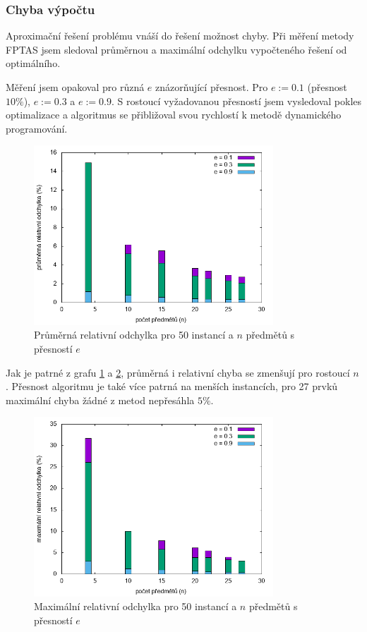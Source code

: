 \documentclass{article}
\begin{document}
\subsubsection*{Chyba výpočtu}

Aproximační řešení problému vnáší do řešení možnost chyby.
Při měření metody FPTAS jsem sledoval průměrnou a maximální odchylku vypočteného řešení od optimálního.

Měření jsem opakoval pro různá $e$ znázorňující přesnost.
Pro $e := 0.1$ (přesnost $10 \%$), $e := 0.3$ a $e := 0.9$.
S rostoucí vyžadovanou přesností jsem vysledoval pokles optimalizace a algoritmus se přibližoval svou rychlostí k metodě dynamického programování.

\begin{figure}[ht]
    \centering
    \includegraphics[width=0.8\textwidth]{average-error.png}
    \caption{Průměrná relativní odchylka pro 50 instancí a $n$ předmětů s přesností $e$}
    \label{fig:g5}
\end{figure}

Jak je patrné z grafu \ref{fig:g5} a \ref{fig:g6}, průměrná i relativní chyba se zmenšují pro rostoucí $n$.
Přesnost algoritmu je také více patrná na menších instancích, pro 27 prvků maximální chyba žádné z metod nepřesáhla $5 \%$.

\begin{figure}[ht]
    \centering
    \includegraphics[width=0.8\textwidth]{max-error.png}
    \caption{Maximální relativní odchylka pro 50 instancí a $n$ předmětů s přesností $e$}
    \label{fig:g6}
\end{figure}
\end{document}
